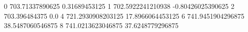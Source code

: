 0 703.71337890625 0.31689453125
1 702.5922241210938 -0.80426025390625
2 703.396484375 0.0
4 721.2930908203125 17.8966064453125
6 741.9451904296875 38.5487060546875
8 741.0213623046875 37.6248779296875
